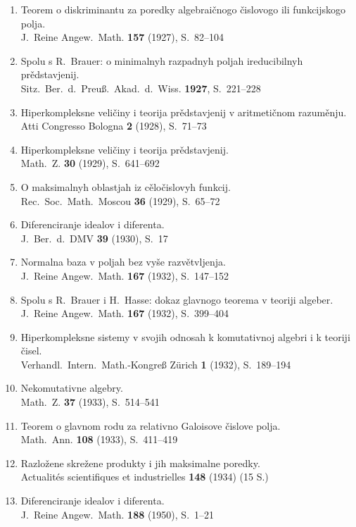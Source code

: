 \documentclass[11pt]{article}
\newcommand{\foreign}[1]{#1}
\begin{document}
\begin{enumerate}[label={\small\arabic*.},leftmargin=2em,itemsep=0.3em]
\item Teorem o diskriminantu za poredky algebraičnogo čislovogo ili funkcijskogo polja.\\
\foreign{J.\ Reine Angew.\ Math.} \textbf{157} (1927), S.~82--104

\item Spolu s R.\ Brauer: o minimalnyh razpadnyh poljah ireducibilnyh prědstavjenij.\\
\foreign{Sitz.\ Ber.\ d.\ Preuß.\ Akad.\ d.\ Wiss.} \textbf{1927}, S.~221--228

\item Hiperkompleksne veličiny i teorija prědstavjenij v aritmetičnom razuměnju.\\
\foreign{Atti Congresso Bologna} \textbf{2} (1928), S.~71--73

\item Hiperkompleksne veličiny i teorija prědstavjenij.\\
\foreign{Math.\ Z.} \textbf{30} (1929), S.~641--692

\item O maksimalnyh oblastjah iz cěločislovyh funkcij.\\
\foreign{Rec.\ Soc.\ Math.\ Moscou} \textbf{36} (1929), S.~65--72

\item Diferenciranje idealov i diferenta.\\
\foreign{J.\ Ber.\ d.\ DMV} \textbf{39} (1930), S.~17

\item Normalna baza v poljah bez vyše razvětvljenja.\\
\foreign{J.\ Reine Angew.\ Math.} \textbf{167} (1932), S.~147--152

\item Spolu s R.\ Brauer i H.\ Hasse: dokaz glavnogo teorema v teoriji algeber.\\
\foreign{J.\ Reine Angew.\ Math.} \textbf{167} (1932), S.~399--404

\item Hiperkompleksne sistemy v svojih odnosah k komutativnoj algebri i k teoriji čisel.\\
\foreign{Verhandl.\ Intern.\ Math.-Kongreß Zürich} \textbf{1} (1932), S.~189--194

\item Nekomutativne algebry.\\
\foreign{Math.\ Z.} \textbf{37} (1933), S.~514--541

\item Teorem o glavnom rodu za relativno Galoisove čislove polja.\\
\foreign{Math.\ Ann.} \textbf{108} (1933), S.~411--419

\item Razložene skrežene produkty i jih maksimalne poredky.\\
\foreign{Actualités scientifiques et industrielles} \textbf{148} (1934) (15 S.)

\item Diferenciranje idealov i diferenta.\\
\foreign{J.\ Reine Angew.\ Math.} \textbf{188} (1950), S.~1--21
\end{enumerate}
\end{document}
